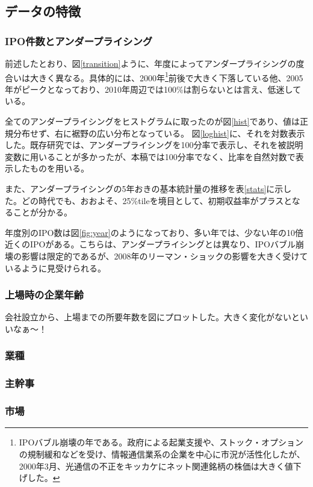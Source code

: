 \documentclass{jsarticle}
\begin{document}
\subsection{データの特徴}
\subsubsection{IPO件数とアンダープライシング}
前述したとおり、図\ref{transition}ように、年度によってアンダープライシングの度合いは大きく異なる。具体的には、2000年\footnote[8]{IPOバブル崩壊の年である。政府による起業支援や、ストック・オプションの規制緩和などを受け、情報通信業系の企業を中心に市況が活性化したが、2000年3月、光通信の不正をキッカケにネット関連銘柄の株価は大きく値下げした。}前後で大きく下落している他、2005年がピークとなっており、2010年周辺では100\%は割らないとは言え、低迷している。\par
全てのアンダープライシングをヒストグラムに取ったのが図\ref{hist}であり、値は正規分布せず、右に裾野の広い分布となっている。
図\ref{loghist}に、それを対数表示した。既存研究では、アンダープライシングを100分率で表示し、それを被説明変数に用いることが多かったが、本稿では100分率でなく、比率を自然対数で表示したものを用いる。\par
また、アンダープライシングの5年おきの基本統計量の推移を表\ref{stats}に示した。どの時代でも、おおよそ、25\%tileを境目として、初期収益率がプラスとなることが分かる。\par
年度別のIPO数は図\ref{fig:year}のようになっており、多い年では、少ない年の10倍近くのIPOがある。こちらは、アンダープライシングとは異なり、IPOバブル崩壊の影響は限定的であるが、2008年のリーマン・ショックの影響を大きく受けているように見受けられる。
\subsubsection{上場時の企業年齢}
会社設立から、上場までの所要年数を図にプロットした。大きく変化がないといいなぁ〜！


\subsubsection{業種}


\subsubsection{主幹事}
\subsubsection{市場}
\end{document}
